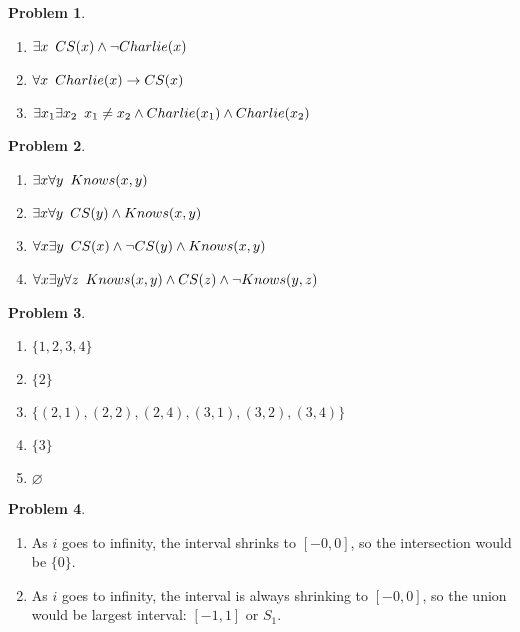 \documentclass[11pt]{article}
\theoremstyle{definition}
\theoremstyle{case}
\theoremstyle{theorem}
\newtheorem{prob}{Problem}
\begin{document}
\begin{prob}\end{prob}
\begin{enumerate}[label=(\alph*)]
\item
$\exists x \hspace{5px} CS(x) \land \neg Charlie(x)$
\item
$\forall x \hspace{5px} Charlie(x) \rightarrow CS(x)$
\item
$\exists x_1 \exists x_2 \hspace{5px} x_1 \neq x_2 \land Charlie(x_1) \land Charlie(x_2)$
\end{enumerate}

\begin{prob}\end{prob}

\begin{enumerate}[label=(\alph*)]
\item 
$\exists x \forall y \hspace{5px} Knows(x, y)$

\item
$\exists x \forall y \hspace{5px} CS(y) \land Knows(x, y)$

\item
$\forall x \exists y \hspace{5px} CS(x) \land \neg CS(y) \land Knows(x, y)$

\item
$\forall x \exists y \forall z \hspace{5px} Knows(x, y) \land CS(z) \land \neg Knows(y, z)$
\end{enumerate}

\begin{prob}\end{prob}
\begin{enumerate}[label=(\alph*)]
\item
$\{1, 2, 3, 4\}$

\item
$\{2\}$

\item
$\{(2, 1), (2, 2), (2, 4), (3, 1), (3, 2), (3, 4)\}$

\item
$\{3\}$

\item
$\varnothing$
\end{enumerate}

\begin{prob}\end{prob}
\begin{enumerate}[label=(\alph*)]
\item
As $i$ goes to infinity, the interval shrinks to $[-0, 0]$, so the intersection would be $\{0\}$.

\item
As $i$ goes to infinity, the interval is always shrinking to $[-0, 0]$, so the union would be largest interval: $[-1, 1]$ or $S_1$.

\end{enumerate}
\end{document}
